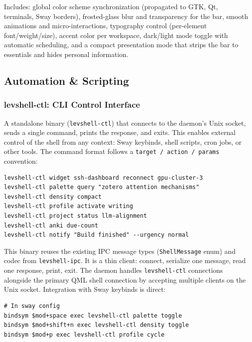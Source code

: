\documentclass[11pt,a4paper]{article}
\begin{document}
Includes: global color scheme synchronization (propagated to GTK, Qt, terminals, Sway borders), frosted-glass blur and transparency for the bar, smooth animations and micro-interactions, typography control (per-element font/weight/size), accent color per workspace, dark/light mode toggle with automatic scheduling, and a compact presentation mode that strips the bar to essentials and hides personal information.


\subsection{Automation \& Scripting}
\label{sec:features-automation}

\subsubsection{levshell-ctl: CLI Control Interface}
A standalone binary (\texttt{levshell-ctl}) that connects to the daemon's Unix socket, sends a single command, prints the response, and exits. This enables external control of the shell from any context: Sway keybinds, shell scripts, cron jobs, or other tools. The command format follows a \texttt{target / action / params} convention:

\begin{lstlisting}[language={}]
levshell-ctl widget ssh-dashboard reconnect gpu-cluster-3
levshell-ctl palette query "zotero attention mechanisms"
levshell-ctl density compact
levshell-ctl profile activate writing
levshell-ctl project status llm-alignment
levshell-ctl anki due-count
levshell-ctl notify "Build finished" --urgency normal
\end{lstlisting}

This binary reuses the existing IPC message types (\texttt{ShellMessage} enum) and codec from \texttt{levshell-ipc}. It is a thin client: connect, serialize one message, read one response, print, exit. The daemon handles \texttt{levshell-ctl} connections alongside the primary QML shell connection by accepting multiple clients on the Unix socket. Integration with Sway keybinds is direct:

\begin{lstlisting}[language={}]
# In sway config
bindsym $mod+space exec levshell-ctl palette toggle
bindsym $mod+shift+n exec levshell-ctl density toggle
bindsym $mod+p exec levshell-ctl profile cycle
\end{lstlisting}
\end{document}
